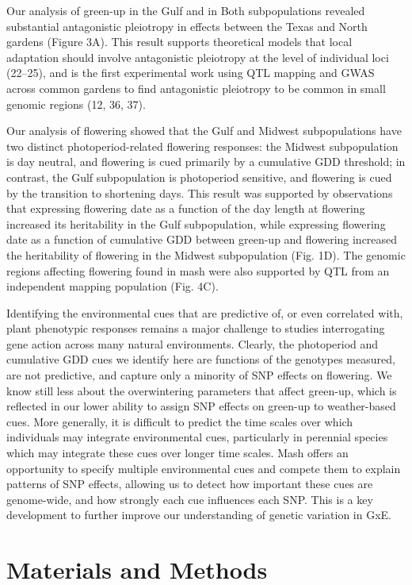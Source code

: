 \documentclass[
  9pt,
  twocolumn,
  twoside]{pnas-new}
\begin{document}
Our analysis of green-up in the Gulf and in Both subpopulations revealed
substantial antagonistic pleiotropy in effects between the Texas and
North gardens (Figure 3A). This result supports theoretical models that
local adaptation should involve antagonistic pleiotropy at the level of
individual loci (22--25), and is the first experimental work using QTL
mapping and GWAS across common gardens to find antagonistic pleiotropy
to be common in small genomic regions (12, 36, 37).

Our analysis of flowering showed that the Gulf and Midwest
subpopulations have two distinct photoperiod-related flowering
responses: the Midwest subpopulation is day neutral, and flowering is
cued primarily by a cumulative GDD threshold; in contrast, the Gulf
subpopulation is photoperiod sensitive, and flowering is cued by the
transition to shortening days. This result was supported by observations
that expressing flowering date as a function of the day length at
flowering increased its heritability in the Gulf subpopulation, while
expressing flowering date as a function of cumulative GDD between
green-up and flowering increased the heritability of flowering in the
Midwest subpopulation (Fig. 1D). The genomic regions affecting flowering
found in mash were also supported by QTL from an independent mapping
population (Fig. 4C).

Identifying the environmental cues that are predictive of, or even
correlated with, plant phenotypic responses remains a major challenge to
studies interrogating gene action across many natural environments.
Clearly, the photoperiod and cumulative GDD cues we identify here are
functions of the genotypes measured, are not predictive, and capture
only a minority of SNP effects on flowering. We know still less about
the overwintering parameters that affect green-up, which is reflected in
our lower ability to assign SNP effects on green-up to weather-based
cues. More generally, it is difficult to predict the time scales over
which individuals may integrate environmental cues, particularly in
perennial species which may integrate these cues over longer time
scales. Mash offers an opportunity to specify multiple environmental
cues and compete them to explain patterns of SNP effects, allowing us to
detect how important these cues are genome-wide, and how strongly each
cue influences each SNP. This is a key development to further improve
our understanding of genetic variation in GxE.

\section{Materials and Methods}\label{materials-and-methods}
\end{document}
